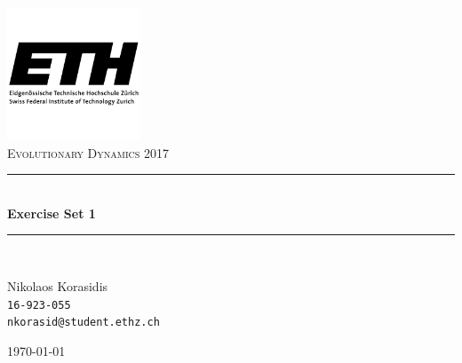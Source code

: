 \documentclass[a4paper, 11pt]{article}
\newcommand{\HRule}{\rule{\linewidth}{0.5mm}}
\begin{document}
\begin{titlepage}
\centering

\includegraphics[width=150px]{ETH.png}\\[1cm]    
\textsc{\Large Evolutionary Dynamics 2017} \\[0.5cm]

\HRule \\[0.5cm]
{\huge \bfseries Exercise Set 1}\\[0.2cm]
\HRule \\[1.5cm]

\begin{minipage}{0.4\textwidth}
\large
Nikolaos Korasidis \\
\texttt{16-923-055} \\
\texttt{nkorasid@student.ethz.ch}
\end{minipage}

\vfill

{\large \today}
\end{titlepage}

\pagestyle{myheadings}

\clearpage



%
%
%
\end{document}
